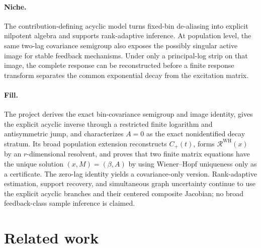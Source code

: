 \documentclass{article}
\begin{document}
\paragraph{Niche.} The contribution-defining acyclic model turns fixed-bin de-aliasing into explicit nilpotent algebra and supports rank-adaptive inference. At population level, the same two-lag covariance semigroup also exposes the possibly singular active image for stable feedback mechanisms. Under only a principal-log strip on that image, the complete response can be reconstructed before a finite response transform separates the common exponential decay from the excitation matrix.

\paragraph{Fill.} The project derives the exact bin-covariance semigroup and image identity, gives the explicit acyclic inverse through a restricted finite logarithm and antisymmetric jump, and characterizes \(A=0\) as the exact nonidentified decay stratum. Its broad population extension reconstructs \(C_+(t)\), forms \(\mathcal R^{\mathrm{WH}}(x)\) by an \(r\)-dimensional resolvent, and proves that two finite matrix equations have the unique solution \((x,M)=(\beta,A)\) by using Wiener--Hopf uniqueness only as a certificate. The zero-lag identity yields a covariance-only version. Rank-adaptive estimation, support recovery, and simultaneous graph uncertainty continue to use the explicit acyclic branches and their centered composite Jacobian; no broad feedback-class sample inference is claimed.

\section{Related work}
\end{document}
